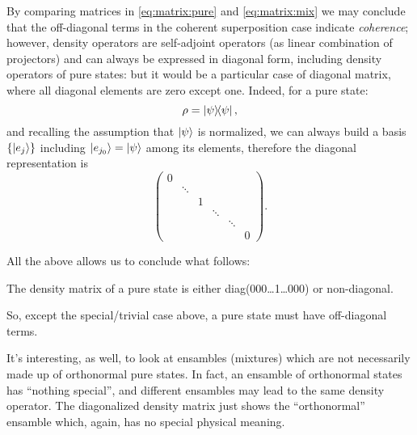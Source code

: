 By comparing matrices in \eqref{eq:matrix:pure} and \eqref{eq:matrix:mix}
we may conclude that the off-diagonal terms in the coherent superposition case
indicate \emph{coherence}; however, density operators are self-adjoint operators
(as linear combination of projectors) and can always be expressed in
diagonal form, including density operators of pure states: but it would be
a particular case of diagonal matrix, where all diagonal elements are zero
except one. Indeed, for a pure state:
\[
  \rho = \ketbra{\psi}{\psi}\text{,}
\]
and recalling the assumption that $\ket{\psi}$ is normalized,
we can always build a basis $\qty{\ket{e_j}}$ including $\ket{e_{j_0}} = \ket{\psi}$
among its elements, therefore the diagonal representation is
\[
  \begin{pmatrix}
    0           &       &       &       &       &           \\
                &\ddots &       &       &       &           \\
                &       &1      &       &       &           \\
                &       &       &\ddots &       &           \\
                &       &       &       &\ddots &           \\
                &       &       &       &       &0
  \end{pmatrix}\text{.}
\]

All the above allows us to conclude what follows:
\begin{remark}
  The density matrix of a pure state is either diag(000\dots1\dots000) or non-diagonal.

  So, except the special/trivial case above, a pure state must have off-diagonal terms.
\end{remark}

It's interesting, as well, to look at ensambles (mixtures)
which are not necessarily made up of orthonormal pure states.
In fact, an ensamble of orthonormal states has ``nothing special'',
and different ensambles may lead to the same density operator.
The diagonalized density matrix just shows the ``orthonormal''
ensamble which, again, has no special physical meaning.

